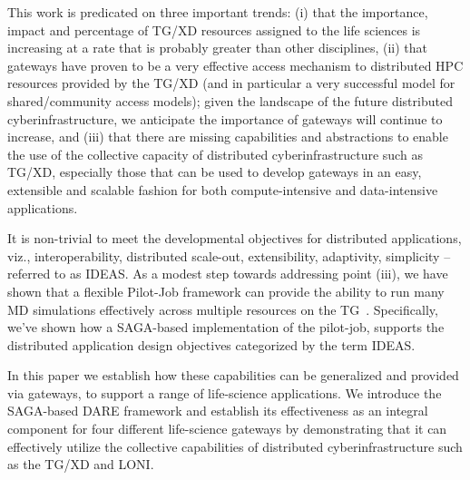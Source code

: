 \documentclass[]{article}
\begin{document}
This work is predicated on three important trends: (i) that the
importance, impact and percentage of TG/XD resources assigned to the
life sciences is increasing at a rate that is probably greater than
other disciplines, (ii) that gateways have proven to be a very
effective access mechanism to distributed HPC resources provided by
the TG/XD (and in particular a very successful model for
shared/community access models); given the landscape of the future
distributed cyberinfrastructure, we anticipate the importance of
gateways will continue to increase, and (iii) that there are missing
capabilities and abstractions to enable the use of the collective
capacity of distributed cyberinfrastructure such as TG/XD, especially
those that can be used to develop gateways in an easy, extensible and
scalable fashion for both compute-intensive and data-intensive
applications.

It is non-trivial to meet the developmental objectives for distributed
applications, viz., interoperability, distributed scale-out,
extensibility, adaptivity, simplicity -- referred to as
IDEAS\cite{ideas}.  As a modest step towards addressing point (iii),
we have shown that a flexible Pilot-Job framework can provide the
ability to run many MD simulations effectively across multiple
resources on the TG~\cite{saga-royalsoc, saga-ccgrid10}.
Specifically, we've shown how a SAGA-based implementation of the
pilot-job, supports the distributed application design objectives
categorized by the term IDEAS\cite{ideas}.

In this paper we establish how these capabilities can be generalized
and provided via gateways, to support a range of life-science
applications.  We introduce the SAGA-based DARE framework and
establish its effectiveness as an integral component for four
different life-science gateways by demonstrating that it can
effectively utilize the collective capabilities of distributed
cyberinfrastructure such as the TG/XD and LONI.
\end{document}
